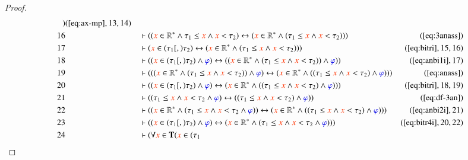 \begin{proof}
\begin{align}
      )&(\mbox{\ref{eq:ax-mp}},13,14)\notag
  \\ 16 &&  & \vdash ( ( \msc{x} \in \mathbb{R}^{\ast} \wedge \tau_1 \le \msc{x}
      \wedge \msc{x} < \tau_2 ) \leftrightarrow ( \msc{x}
      \in \mathbb{R}^{\ast} \wedge ( \tau_1 \le \msc{x} \wedge
      \msc{x} < \tau_2 ) ) )&(\mbox{\ref{eq:3anass}})\notag
  \\ 17 &&  & \vdash ( \msc{x} \in ( \tau_1 [,) \tau_2 ) \leftrightarrow (
      \msc{x} \in \mathbb{R}^{\ast} \wedge ( \tau_1 \le
      \msc{x} \wedge \msc{x} < \tau_2 ) )
      )&(\mbox{\ref{eq:bitri}},15,16)\notag
  \\ 18 &&  & \vdash ( ( \msc{x} \in ( \tau_1 [,) \tau_2 ) \wedge \mw{\varphi}
      ) \leftrightarrow ( ( \msc{x} \in \mathbb{R}^{\ast}
      \wedge ( \tau_1 \le \msc{x} \wedge \msc{x} < \tau_2 )
      ) \wedge \mw{\varphi} )
      )&(\mbox{\ref{eq:anbi1i}},17)\notag
  \\ 19 &&  & \vdash ( ( ( \msc{x} \in \mathbb{R}^{\ast} \wedge ( \tau_1 \le
      \msc{x} \wedge \msc{x} < \tau_2 ) ) \wedge
      \mw{\varphi} ) \leftrightarrow ( \msc{x} \in
      \mathbb{R}^{\ast} \wedge ( ( \tau_1 \le \msc{x} \wedge
      \msc{x} < \tau_2 ) \wedge \mw{\varphi} ) )
      )&(\mbox{\ref{eq:anass}})\notag
  \\ 20 &&  & \vdash ( ( \msc{x} \in ( \tau_1 [,) \tau_2 ) \wedge \mw{\varphi}
      ) \leftrightarrow ( \msc{x} \in \mathbb{R}^{\ast} \wedge
      ( ( \tau_1 \le \msc{x} \wedge \msc{x} < \tau_2 )
      \wedge \mw{\varphi} ) )
      )&(\mbox{\ref{eq:bitri}},18,19)\notag
  \\ 21 &&  & \vdash ( ( \tau_1 \le \msc{x} \wedge \msc{x} < \tau_2 \wedge
      \mw{\varphi} ) \leftrightarrow ( ( \tau_1 \le \msc{x}
      \wedge \msc{x} < \tau_2 ) \wedge \mw{\varphi} )
      )&(\mbox{\ref{eq:df-3an}})\notag
  \\ 22 &&  & \vdash ( ( \msc{x} \in \mathbb{R}^{\ast} \wedge ( \tau_1 \le \msc{x}
      \wedge \msc{x} < \tau_2 \wedge \mw{\varphi} ) )
      \leftrightarrow ( \msc{x} \in \mathbb{R}^{\ast} \wedge (
      ( \tau_1 \le \msc{x} \wedge \msc{x} < \tau_2 ) \wedge
      \mw{\varphi} ) ) )&(\mbox{\ref{eq:anbi2i}},21)\notag
  \\ 23 &&  & \vdash ( ( \msc{x} \in ( \tau_1 [,) \tau_2 ) \wedge \mw{\varphi}
      ) \leftrightarrow ( \msc{x} \in \mathbb{R}^{\ast} \wedge
      ( \tau_1 \le \msc{x} \wedge \msc{x} < \tau_2 \wedge
      \mw{\varphi} ) )
      )&(\mbox{\ref{eq:bitr4i}},20,22)\notag
  \\ 24 &&  & \vdash ( \forall \msc{x} \in \mathbf{T} ( \msc{x} \in ( \tau_1

\end{align}
\end{proof}
